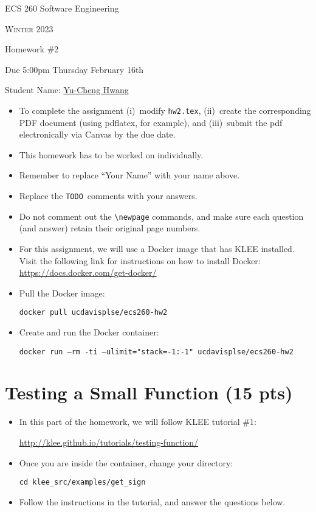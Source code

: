 \documentclass[12pt,letterpaper]{article}
\begin{document}
\begin{center}
\bigskip
{\LARGE ECS 260 Software Engineering} \medskip

{\large \textsc{Winter 2023}} \bigskip

{\Large Homework \#2} \bigskip

{\large Due 5:00pm Thursday February 16th} \bigskip

{\Large Student Name: \underline{Yu-Cheng Hwang}} \bigskip

\end{center}

\begin{itemize}
  \item To complete the assignment (i)~modify \texttt{hw2.tex}, (ii)~create the
    corresponding PDF document (using pdflatex, for example), and (iii)~submit the
    pdf electronically via Canvas by the due date.
  \item This homework has to be worked on individually.
  \item Remember to replace ``Your Name'' with your name above.
  \item Replace the \texttt{TODO}~comments with your answers.
  \item Do not comment out the \verb=\newpage= commands, and make sure
    each question (and answer) retain their original page numbers.
  \item For this assignment, we will use a Docker image that has KLEE
    installed. Visit the following link for instructions on how to
    install Docker:
    \href{https://docs.docker.com/get-docker/}{https://docs.docker.com/get-docker/}
\item Pull the Docker image:
  
  \texttt{docker pull ucdavisplse/ecs260-hw2}
  
\item Create and run the Docker container:

  \texttt{docker run --rm -ti --ulimit="stack=-1:-1" ucdavisplse/ecs260-hw2}
\end{itemize}
\newpage


\section{Testing a Small Function (15 pts)}

\begin{itemize}

\item In this part of the homework, we will follow KLEE tutorial \#1:

\href{http://klee.github.io/tutorials/testing-function/}{http://klee.github.io/tutorials/testing-function/}

  
\item Once you are inside the container, change your directory:

  \texttt{cd klee\_src/examples/get\_sign}

  \item Follow the instructions in the tutorial, and answer the
    questions below.
\end{itemize}
\end{document}
